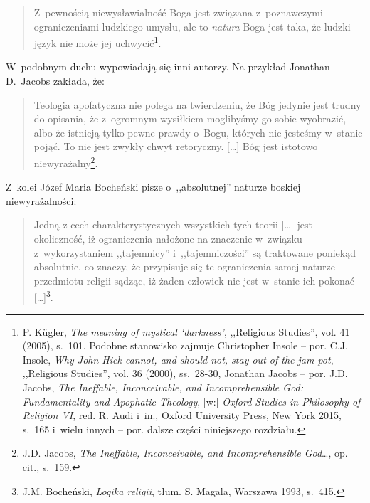 \begin{quote}
Z~pewnością niewysławialność Boga jest związana z~poznawczymi ograniczeniami ludzkiego umysłu, ale to \textit{natura} Boga jest taka, że ludzki język nie może jej uchwycić\footnote{P. Kügler, \textit{The meaning of mystical ‘darkness'}, ,,Religious Studies'', vol. 41 (2005), s.~101. Podobne stanowisko zajmuje Christopher Insole -- por. C.J. Insole, \textit{Why John Hick cannot, and should not, stay out of the jam pot}, ,,Religious Studies'', vol. 36 (2000), ss.~28-30, Jonathan Jacobs -- por. J.D. Jacobs, \textit{The Ineffable, Inconceivable, and Incomprehensible God: Fundamentality and Apophatic Theology}, [w:] \textit{Oxford Studies in Philosophy of Religion VI}, red. R. Audi i~in., Oxford University Press, New York 2015, s.~165 i~wielu innych -- por. dalsze części niniejszego rozdziału.}.
\end{quote}

W~podobnym duchu wypowiadają się inni autorzy. Na przykład Jonathan D.~Jacobs zakłada, że:

\begin{quote}
Teologia apofatyczna nie polega na twierdzeniu, że Bóg jedynie jest trudny do opisania, że z~ogromnym wysiłkiem moglibyśmy go sobie wyobrazić, albo że istnieją tylko pewne prawdy o~Bogu, których nie jesteśmy w~stanie pojąć. To nie jest zwykły chwyt retoryczny. [\ldots] Bóg jest istotowo niewyrażalny\footnote{J.D. Jacobs, \textit{The Ineffable, Inconceivable, and Incomprehensible God}\ldots, op. cit., s.~159.}.
\end{quote}
Z~kolei Józef Maria Bocheński pisze o~,,absolutnej'' naturze boskiej niewyrażalności:

\begin{quote}
Jedną z cech charakterystycznych wszystkich tych teorii [\ldots] jest okoliczność, iż ograniczenia nałożone na znaczenie w~związku z~wykorzystaniem ,,tajemnicy'' i~,,tajemniczości'' są traktowane poniekąd absolutnie, co znaczy, że przypisuje się te ograniczenia samej naturze przedmiotu religii sądząc, iż żaden człowiek nie jest w~stanie ich pokonać [\ldots]\footnote{J.M. Bocheński, \textit{Logika religii}, tłum. S. Magala, Warszawa 1993, s.~415.}.
\end{quote}

